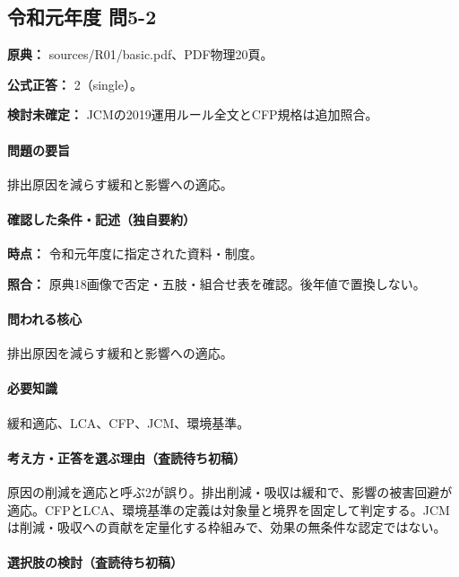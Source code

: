 \subsection{令和元年度 問5-2}
\label{q:r01-reg-basic-5-2}

\noindent\textbf{原典：} sources/R01/basic.pdf、PDF物理20頁。

\textbf{公式正答：} 2（single）。

\par\textbf{検討未確定：} JCMの2019運用ルール全文とCFP規格は追加照合。

\paragraph{問題の要旨} 排出原因を減らす緩和と影響への適応。

\paragraph{確認した条件・記述（独自要約）}\mbox{}\par

\noindent\textbf{時点：} 令和元年度に指定された資料・制度。\par

\noindent\textbf{照合：} 原典18画像で否定・五肢・組合せ表を確認。後年値で置換しない。\par

\paragraph{問われる核心} 排出原因を減らす緩和と影響への適応。

\paragraph{必要知識} 緩和適応、LCA、CFP、JCM、環境基準。

\paragraph{考え方・正答を選ぶ理由（査読待ち初稿）} 原因の削減を適応と呼ぶ2が誤り。排出削減・吸収は緩和で、影響の被害回避が適応。CFPとLCA、環境基準の定義は対象量と境界を固定して判定する。JCMは削減・吸収への貢献を定量化する枠組みで、効果の無条件な認定ではない。

\paragraph{選択肢の検討（査読待ち初稿）}\mbox{}\par

